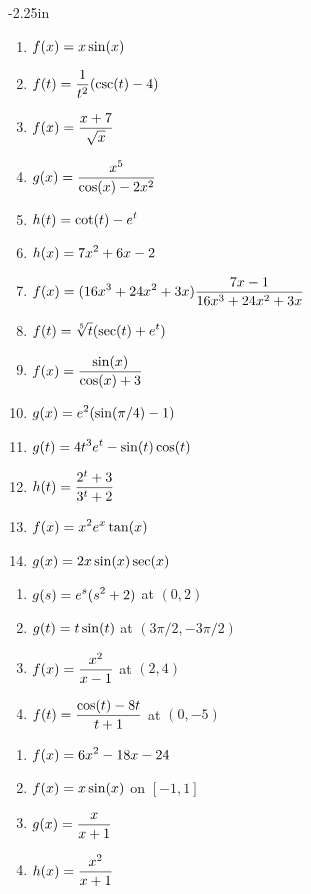 \begin{adjustwidth*}{}{-2.25in}
\begin{multicols*}{2}

\begin{enumerate}[1),resume]
\item $\displaystyle f(x) = x \sin(x)$
\item $\displaystyle f(t) = \frac{1}{t^2} (\csc(t) - 4)$
\item $\displaystyle f(x) = \frac{x+7}{\sqrt{x}}$
\item $\displaystyle g(x) = \frac{x^5}{\cos(x) - 2x^2}$
\item $\displaystyle h(t) = \cot(t) - e^t$
\item $\displaystyle h(x) = 7x^2 + 6x - 2$
\item $\displaystyle f(x) = (16x^3 + 24x^2 + 3x) \frac{7x - 1}{16x^3 + 24x^2 + 3x}$
\item $\displaystyle f(t) = \sqrt[5]{t} (\sec(t) + e^t)$
\item $\displaystyle f(x) = \frac{\sin(x)}{\cos(x) + 3}$
\item $\displaystyle g(x) = e^2 (\sin(\pi/4) - 1)$
\item $\displaystyle g(t) = 4t^3 e^t - \sin(t) \cos(t)$
\item $\displaystyle h(t) = \frac{2^t + 3}{3^t + 2}$
\item $\displaystyle f(x) = x^2 e^x \tan(x)$
\item $\displaystyle g(x) = 2x \sin(x) \sec(x)$
\end{enumerate}


\begin{enumerate}[1),resume]
\item $\displaystyle g(s) = e^s(s^2 + 2)$ at $(0,2)$
\item $\displaystyle g(t) = t \sin(t)$ at $(3\pi/2, -3\pi/2)$
\item $\displaystyle f(x) = \frac{x^2}{x-1}$ at $(2,4)$
\item $\displaystyle f(t) = \frac{\cos(t) - 8t}{t + 1}$ at $(0,-5)$
\end{enumerate}


\begin{enumerate}[1),resume]
\item $\displaystyle f(x) = 6x^2 - 18x - 24$
\item $\displaystyle f(x) = x \sin(x)$ on $[-1,1]$
\item $\displaystyle g(x) = \frac{x}{x+1}$
\item $\displaystyle h(x) = \frac{x^2}{x+1}$
\end{enumerate}


\end{multicols*}
\end{adjustwidth*}
